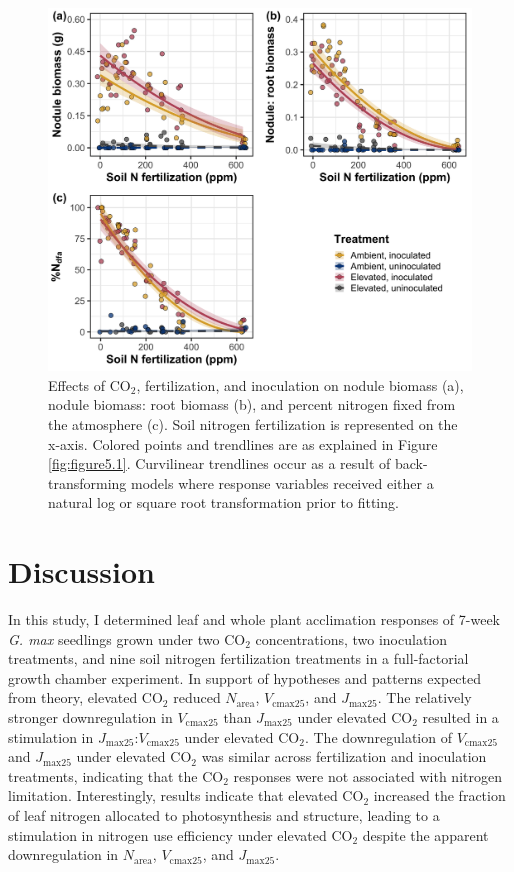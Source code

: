 \newpage
\begin{figure}
    \centering
    \includegraphics[scale = 0.074]{ch5_NxCO2xI/figs/NxCO2xI_fig5_nFix.png}
    \caption[Effects of CO$_2$, fertilization, and inoculation on nodule biomass, nodule biomass: root biomass, and percent nitrogen fixed from the atmosphere]{Effects of CO$_2$, fertilization, and inoculation on nodule biomass (a), nodule biomass: root biomass (b), and percent nitrogen fixed from the atmosphere (c). Soil nitrogen fertilization is represented on the x-axis. Colored points and trendlines are as explained in Figure \ref{fig:figure5.1}. Curvilinear trendlines occur as a result of back-transforming models where response variables received either a natural log or square root transformation prior to fitting.}
    \label{fig:figure5.5}
\end{figure}
\clearpage

\section{Discussion}
\noindent In this study, I determined leaf and whole plant acclimation responses of 7-week \textit{G. max} seedlings grown under two CO$_2$ concentrations, two inoculation treatments, and nine soil nitrogen fertilization treatments in a full-factorial growth chamber experiment. In support of hypotheses and patterns expected from theory, elevated CO$_2$ reduced $N_\mathrm{area}$, $V_\mathrm{cmax25}$, and $J_\mathrm{max25}$. The relatively stronger downregulation in $V_\mathrm{cmax25}$ than $J_\mathrm{max25}$ under elevated CO$_2$ resulted in a stimulation in $J_\mathrm{max25}$:$V_\mathrm{cmax25}$ under elevated CO$_2$. The downregulation of $V_\mathrm{cmax25}$ and $J_\mathrm{max25}$ under elevated CO$_2$ was similar across fertilization and inoculation treatments, indicating that the CO$_2$ responses were not associated with nitrogen limitation. Interestingly, results indicate that elevated CO$_2$ increased the fraction of leaf nitrogen allocated to photosynthesis and structure, leading to a stimulation in nitrogen use efficiency under elevated CO$_2$ despite the apparent downregulation in $N_\mathrm{area}$, $V_\mathrm{cmax25}$, and $J_\mathrm{max25}$.


